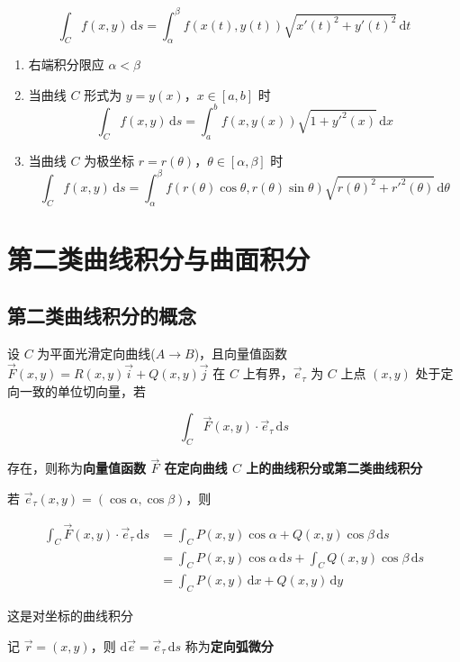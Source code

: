 \documentclass[lang = zh , final , oneside , openany , titlepage , zihao = -4 , linespread = 1.3 , baselineskip = false , cjk-font = windows , text-font = newtx , math-font = newtx , math-style = ISO , uppercase-greek = upright , integral-limits = false]{sjtureport}
\begin{document}
\[\int_C f(x,y)\,\mathrm{d}s = \int_\alpha^\beta f(x(t),y(t))\sqrt{x'(t)^2 + y'(t)^2}\,\mathrm{d}t\]

\begin{enumerate}
\item
  右端积分限应 \(\alpha < \beta\)
\item
  当曲线 \(C\) 形式为 \(y=y(x)\)，\(x\in [a,b]\) 时
  \[\displaystyle\int_Cf(x,y)\,\mathrm{d}s =\int_a^bf(x,y(x))\sqrt{1+y'^2(x)}\,\mathrm{d}x\]
\item
  当曲线 \(C\) 为极坐标 \(r=r(\theta)\)，\(\theta\in [\alpha,\beta]\)
  时
  \[\displaystyle\int_Cf(x,y)\,\mathrm{d}s = \int_\alpha^\beta f(r(\theta)\cos\theta,r(\theta)\sin\theta)\sqrt{r(\theta)^2+r'^2(\theta)}\,\mathrm{d}\theta\]
\end{enumerate}

\section{第二类曲线积分与曲面积分}

\subsection{第二类曲线积分的概念}

\begin{definition}
    设 \(C\) 为平面光滑定向曲线(\(A\rightarrow B\))，且向量值函数
\(\vec{F}(x,y) = R(x,y)\vec{i}+Q(x,y)\vec{j}\) 在 \(C\)
上有界，\(\vec{e}_\tau\) 为 \(C\) 上点 \((x,y)\)
处于定向一致的单位切向量，若

\[\int_C \vec{F}(x,y) \cdot \vec{e}_\tau \,\mathrm{d}s\]

存在，则称为\textbf{向量值函数 \(\vec{F}\) 在定向曲线 \(C\)
上的曲线积分或第二类曲线积分}
\end{definition}

若 \(\vec{e}_\tau(x,y) = (\cos\alpha,\cos\beta)\)，则

\[\begin{aligned}
  \int_C \vec{F}(x,y) \cdot \vec{e}_\tau \,\mathrm{d}s &= \int_C P(x,y)\cos\alpha + Q(x,y)\cos\beta \,\mathrm{d}s \\
  &= \int_C P(x,y)\cos\alpha \,\mathrm{d}s + \int_C Q(x,y)\cos\beta \,\mathrm{d}s \\
  &= \int_C P(x,y)\,\mathrm{d}x +  Q(x,y)\,\mathrm{d}y
\end{aligned}\]

这是对坐标的曲线积分

记 \(\vec{r} = (x,y)\)，则
\(\mathrm{d}\vec{e} = \vec{e}_\tau \,\mathrm{d}s\)
称为\textbf{定向弧微分}
\end{document}
